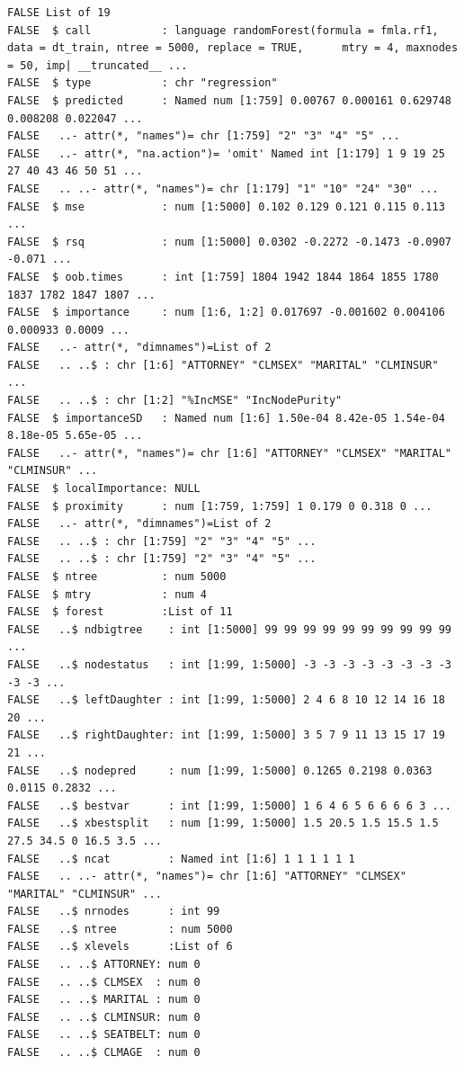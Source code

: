 \documentclass[]{book}
\begin{document}
\begin{verbatim}
FALSE List of 19
FALSE  $ call           : language randomForest(formula = fmla.rf1, data = dt_train, ntree = 5000, replace = TRUE,      mtry = 4, maxnodes = 50, imp| __truncated__ ...
FALSE  $ type           : chr "regression"
FALSE  $ predicted      : Named num [1:759] 0.00767 0.000161 0.629748 0.008208 0.022047 ...
FALSE   ..- attr(*, "names")= chr [1:759] "2" "3" "4" "5" ...
FALSE   ..- attr(*, "na.action")= 'omit' Named int [1:179] 1 9 19 25 27 40 43 46 50 51 ...
FALSE   .. ..- attr(*, "names")= chr [1:179] "1" "10" "24" "30" ...
FALSE  $ mse            : num [1:5000] 0.102 0.129 0.121 0.115 0.113 ...
FALSE  $ rsq            : num [1:5000] 0.0302 -0.2272 -0.1473 -0.0907 -0.071 ...
FALSE  $ oob.times      : int [1:759] 1804 1942 1844 1864 1855 1780 1837 1782 1847 1807 ...
FALSE  $ importance     : num [1:6, 1:2] 0.017697 -0.001602 0.004106 0.000933 0.0009 ...
FALSE   ..- attr(*, "dimnames")=List of 2
FALSE   .. ..$ : chr [1:6] "ATTORNEY" "CLMSEX" "MARITAL" "CLMINSUR" ...
FALSE   .. ..$ : chr [1:2] "%IncMSE" "IncNodePurity"
FALSE  $ importanceSD   : Named num [1:6] 1.50e-04 8.42e-05 1.54e-04 8.18e-05 5.65e-05 ...
FALSE   ..- attr(*, "names")= chr [1:6] "ATTORNEY" "CLMSEX" "MARITAL" "CLMINSUR" ...
FALSE  $ localImportance: NULL
FALSE  $ proximity      : num [1:759, 1:759] 1 0.179 0 0.318 0 ...
FALSE   ..- attr(*, "dimnames")=List of 2
FALSE   .. ..$ : chr [1:759] "2" "3" "4" "5" ...
FALSE   .. ..$ : chr [1:759] "2" "3" "4" "5" ...
FALSE  $ ntree          : num 5000
FALSE  $ mtry           : num 4
FALSE  $ forest         :List of 11
FALSE   ..$ ndbigtree    : int [1:5000] 99 99 99 99 99 99 99 99 99 99 ...
FALSE   ..$ nodestatus   : int [1:99, 1:5000] -3 -3 -3 -3 -3 -3 -3 -3 -3 -3 ...
FALSE   ..$ leftDaughter : int [1:99, 1:5000] 2 4 6 8 10 12 14 16 18 20 ...
FALSE   ..$ rightDaughter: int [1:99, 1:5000] 3 5 7 9 11 13 15 17 19 21 ...
FALSE   ..$ nodepred     : num [1:99, 1:5000] 0.1265 0.2198 0.0363 0.0115 0.2832 ...
FALSE   ..$ bestvar      : int [1:99, 1:5000] 1 6 4 6 5 6 6 6 6 3 ...
FALSE   ..$ xbestsplit   : num [1:99, 1:5000] 1.5 20.5 1.5 15.5 1.5 27.5 34.5 0 16.5 3.5 ...
FALSE   ..$ ncat         : Named int [1:6] 1 1 1 1 1 1
FALSE   .. ..- attr(*, "names")= chr [1:6] "ATTORNEY" "CLMSEX" "MARITAL" "CLMINSUR" ...
FALSE   ..$ nrnodes      : int 99
FALSE   ..$ ntree        : num 5000
FALSE   ..$ xlevels      :List of 6
FALSE   .. ..$ ATTORNEY: num 0
FALSE   .. ..$ CLMSEX  : num 0
FALSE   .. ..$ MARITAL : num 0
FALSE   .. ..$ CLMINSUR: num 0
FALSE   .. ..$ SEATBELT: num 0
FALSE   .. ..$ CLMAGE  : num 0

\end{verbatim}
\end{document}
